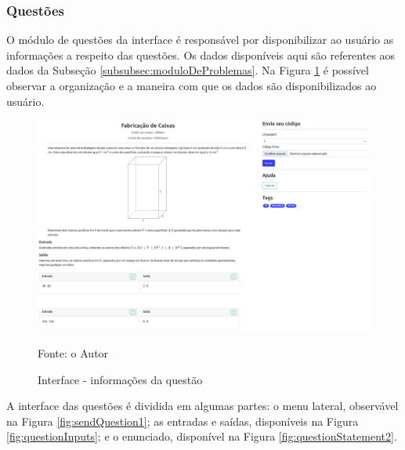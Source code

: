 
\subsubsection{Questões}

O módulo de questões da interface é responsável por disponibilizar ao usuário as informações a respeito das questões. Os dados disponíveis aqui são referentes aos dados da Subseção \ref{subsubsec:moduloDeProblemas}. Na Figura \ref{fig:question3} é possível observar a organização e a maneira com que os dados são disponibilizados ao usuário.

\begin{figure}
    \centering
    \caption{Interface - informações da questão}
    \includegraphics[keepaspectratio=true,scale=0.2]{figuras/question3.eps}
    \label{fig:question3}
    
    \medskip
    Fonte: o Autor
    \medskip
\end{figure}

A interface das questões é dividida em algumas partes: o menu lateral, observável na Figura \ref{fig:sendQuestion1}; as entradas e saídas, disponíveis na Figura \ref{fig:questionInputs}; e o enunciado, disponível na Figura \ref{fig:questionStatement2}.


